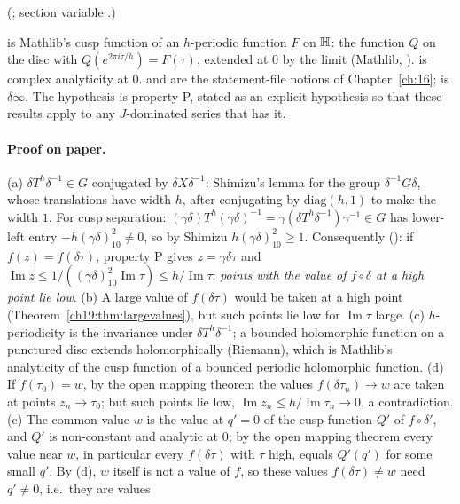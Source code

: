 (; section variable .)
\begin{dictionary}
 is Mathlib's cusp function of an $h$-periodic function $F$ on $\mathbb{H}$: the function $Q$ on the disc with
$Q(e^{2\pi i\tau/h})=F(\tau)$, extended at $0$ by the limit (Mathlib, ).  
is complex analyticity at $0$.   and  are the statement-file notions of Chapter~\ref{ch:16};
 is $\delta\infty$.  The hypothesis  is property P, stated as an explicit hypothesis so that these results
apply to any $J$-dominated series that has it.
\end{dictionary}
\paragraph{Proof on paper.}  (a) $\delta T^{h}\delta^{-1}\in G$ conjugated by $\delta X\delta^{-1}$: Shimizu's lemma for the group $\delta^{-1}G\delta$,
whose translations have width $h$, after conjugating by $\mathrm{diag}(h,1)$ to make the width $1$.  For cusp separation: $(\gamma\delta)T^h(\gamma\delta)^{-1}
=\gamma(\delta T^h\delta^{-1})\gamma^{-1}\in G$ has lower-left entry $-h(\gamma\delta)_{10}^2\ne0$, so by Shimizu $h(\gamma\delta)_{10}^2\ge1$.  Consequently
(): if $f(z)=f(\delta\tau)$, property P gives $z=\gamma\delta\tau$ and $\operatorname{Im}z\le1/((\gamma\delta)_{10}^2\operatorname{Im}\tau)
\le h/\operatorname{Im}\tau$: \emph{points with the value of $f\circ\delta$ at a high point lie low}.  (b) A large value of $f(\delta\tau)$ would be taken at a
high point (Theorem~\ref{ch19:thm:largevalues}), but such points lie low for $\operatorname{Im}\tau$ large.  (c) $h$-periodicity is the invariance under
$\delta T^h\delta^{-1}$; a bounded holomorphic function on a punctured disc extends holomorphically (Riemann), which is Mathlib's analyticity of the
cusp function of a bounded periodic holomorphic function.  (d) If $f(\tau_0)=w$, by the open mapping theorem the values $f(\delta\tau_n)\to w$ are taken
at points $z_n\to\tau_0$; but such points lie low, $\operatorname{Im}z_n\le h/\operatorname{Im}\tau_n\to0$, a contradiction.  (e) The common value $w$ is the value at $q'=0$ of the cusp function $Q'$ of $f\circ\delta'$, and $Q'$ is non-constant
and analytic at $0$; by the open mapping theorem every value near $w$, in particular every $f(\delta\tau)$ with $\tau$ high, equals $Q'(q')$
for some small $q'$.  By (d), $w$ itself is not a value of $f$, so these values $f(\delta\tau)\ne w$ need $q'\ne0$, i.e.\ they are values
